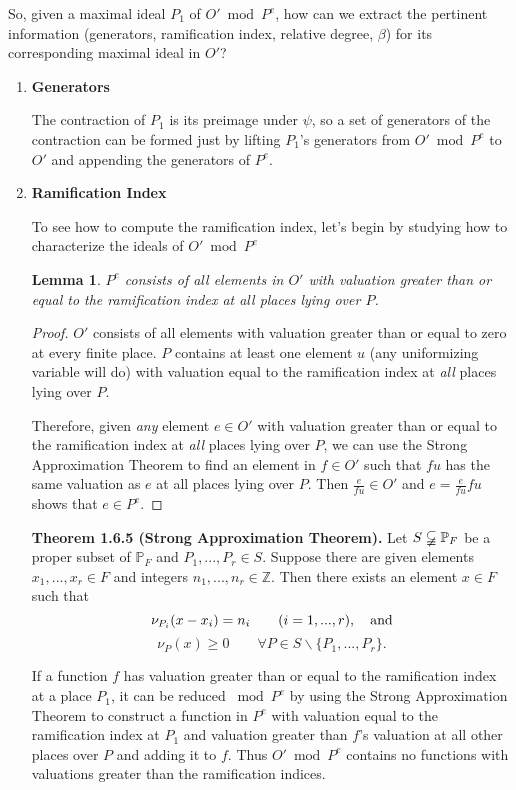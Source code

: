 \documentclass{article}
\newtheorem*{lemma}{Lemma}
\newcommand{\ZZ}{{\mathbb Z}}
\newcommand{\PP}{{\mathbb P}}
\begin{document}
So, given a maximal ideal $P_1$ of $O'\bmod P^e$, how can we extract the
pertinent information (generators, ramification index, relative
degree, $\beta$) for its corresponding maximal ideal in $O'$?

\begin{enumerate}
\item {\bf Generators}

The contraction of $P_1$ is its preimage
under $\psi$, so a set of generators of the contraction can be formed
just by lifting $P_1$'s generators from $O'\bmod P^e$ to $O'$ and
appending the generators of $P^e$.

\item {\bf Ramification Index}

To see how to compute the ramification
index, let's begin by studying how to characterize the ideals
of $O'\bmod P^e$

\begin{lemma}
$P^e$ consists of all elements in $O'$ with valuation greater than or
equal to the ramification index at {\it all} places lying over $P$.
\end{lemma}
\begin{proof}
$O'$ consists of all elements with valuation greater than or equal to
zero at every finite place.
$P$ contains at least one element $u$ (any uniformizing variable will do) with valuation equal
to the ramification index at {\it all} places lying over $P$.

Therefore, given {\it any} element $e \in O'$ with valuation greater than or
equal to the ramification index at {\it all} places lying over $P$,
we can use the Strong Approximation Theorem to find an element in $f \in O'$
such that $fu$ has the same valuation as $e$ at all places lying over $P$.
Then $\frac{e}{fu} \in O'$ and $e = \frac{e}{fu} f u$ shows that $e \in P^e$.
\end{proof}

\begin{mdframed}
{\bf\cite{stich} Theorem 1.6.5 (Strong Approximation Theorem).}
Let $S \varsubsetneqq \PP_F$ be
a proper subset of $\PP_F$ and $P_1 , ... , P_r \in S$. Suppose there are given elements
$x_1 , ... , x_r \in F$ and integers $n_1 , ... , n_r \in \ZZ$. Then there exists an element
$x \in F$ such that
$$\nu_{P_i} (x - x_i ) = n_i \qquad (i=1,...,r), \quad{\rm and}$$
$$\nu_P (x) \ge 0 \qquad \forall P \in S \backslash \{P_1 , ... , P_r\}.$$
\end{mdframed}

If a function $f$ has valuation greater than or equal to the
ramification index at a place $P_1$, it can be reduced $\bmod P^e$ by
using the Strong Approximation Theorem to construct a function in
$P^e$ with valuation equal to the ramification index at $P_1$ and
valuation greater than $f$'s valuation at all other places over $P$
and adding it to $f$.  Thus $O' \bmod P^e$ contains no functions with
valuations greater than the ramification indices.


\end{enumerate}
\end{document}
